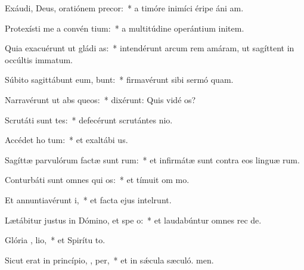 \item Exáudi, Deus, oratiónem   precor:~* a timóre inimíci éripe áni am.
\item Protexísti me a convén tium:~* a multitúdine operántium initem.
\item Quia exacuérunt ut gládi  as:~* intendérunt arcum rem amáram, ut sagíttent in occúltis immatum.
\item Súbito sagittábunt eum,   bunt:~* firmavérunt sibi sermó quam.
\item Narravérunt ut abs queos:~* dixérunt: Quis vidé os?
\item Scrutáti sunt tes:~* defecérunt scrutántes nio.
\item Accédet ho   tum:~* et exaltábi us.
\item Sagíttæ parvulórum factæ sunt  rum:~* et infirmátæ sunt contra eos linguæ rum.
\item Conturbáti sunt omnes qui  os:~* et tímuit om mo.
\item Et annuntiavérunt  i,~* et facta ejus intelrunt.
\item Lætábitur justus in Dómino, et spe  o:~* et laudabúntur omnes rec de.
\item Glória ,  lio,~* et Spirítu to.
\item Sicut erat in princípio,  ,  per,~* et in sǽcula sæculó. men.
